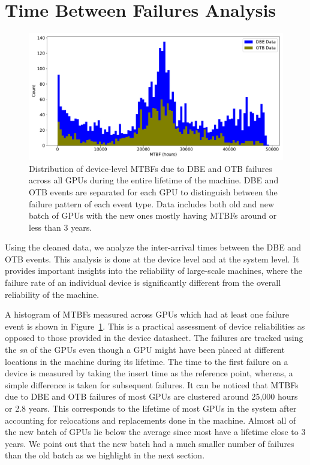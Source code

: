 \section{Time Between Failures Analysis}
\label{section:tbf}

\begin{figure}[bt]
  \begin{center}
    \includegraphics[width=\columnwidth]{figs/MTBF_GPUwise.pdf}
  \end{center}
  \caption{Distribution of device-level MTBFs due to DBE and OTB failures across all GPUs during the
entire lifetime of the machine. DBE and OTB events are separated for each GPU to distinguish between 
the failure pattern of each event type. Data includes both old and new batch of GPUs with the new ones 
mostly having MTBFs around or less than 3 years.}
  \label{fig:Device_MTBFs}
\end{figure}

Using the cleaned data, we analyze the inter-arrival times between the DBE and OTB events. 
This analysis is done at the device level and at the system level. 
It provides important insights into the reliability of large-scale machines, where the 
failure rate of an individual device is significantly different from the overall reliability
of the machine.  

A histogram of MTBFs measured across GPUs which had at least one failure event is shown 
in Figure~\ref{fig:Device_MTBFs}. This is a practical assessment of device reliabilities 
as opposed to those provided in the device datasheet. The failures are tracked using the
{\em sn} of the GPUs even though a GPU might have been placed at different locations in the 
machine during its lifetime. The time to the first failure on a device is measured by taking
the insert time as the reference point, whereas, a simple difference is taken for subsequent
failures. It can be noticed that MTBFs due to DBE and OTB failures of most GPUs are clustered around 
25,000 hours or 2.8 years. This corresponds to the lifetime of most GPUs in the system after accounting 
for relocations and replacements done in the machine. Almost all of the new batch of GPUs lie below 
the average since most have a lifetime close to 3 years. We point out
that the new batch had a much smaller number of failures than
the old batch as we highlight in the next section.

